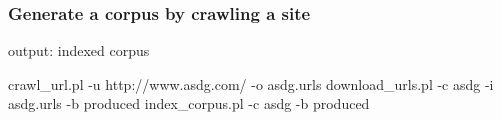 \subsubsection{Generate a corpus by crawling a site}

\begin{boxedverbatim}
 output: indexed corpus

 crawl_url.pl -u http://www.asdg.com/ -o asdg.urls
 download_urls.pl -c asdg -i asdg.urls -b produced
 index_corpus.pl -c asdg -b produced
\end{boxedverbatim}
